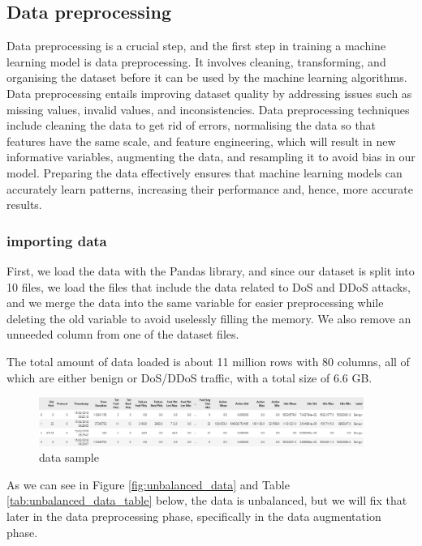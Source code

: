 \subsection{Data preprocessing}
Data preprocessing is a crucial step, and the first step in training a machine learning model is data preprocessing. It involves cleaning, transforming, and organising the dataset before it can be used by the machine learning algorithms. Data preprocessing entails improving dataset quality by addressing issues such as missing values, invalid values, and inconsistencies. Data preprocessing techniques include cleaning the data to get rid of errors, normalising the data so that features have the same scale, and feature engineering, which will result in new informative variables, augmenting the data, and resampling it to avoid bias in our model. Preparing the data effectively ensures that machine learning models can accurately learn patterns, increasing their performance and, hence, more accurate results.



\subsubsection{importing data}
First, we load the data with the Pandas library, and since our dataset is split into 10 files, we load the files that include the data related to DoS and DDoS attacks, and we merge the data into the same variable for easier preprocessing while deleting the old variable to avoid uselessly filling the memory. We also remove an unneeded column from one of the dataset files.



The total amount of data loaded is about 11 million rows with 80 columns, all of which are either benign or DoS/DDoS traffic, with a total size of 6.6 GB.

\begin{figure}[h]
	\centering
	\includegraphics[width=400px]{figures/data_example.png}
	\caption{data sample}
	\label{fig:datasample}
\end{figure}

As we can see in Figure \ref{fig:unbalanced_data} and Table \ref{tab:unbalanced_data_table} below, the data is unbalanced, but we will fix that later in the data preprocessing phase, specifically in the data augmentation phase.

